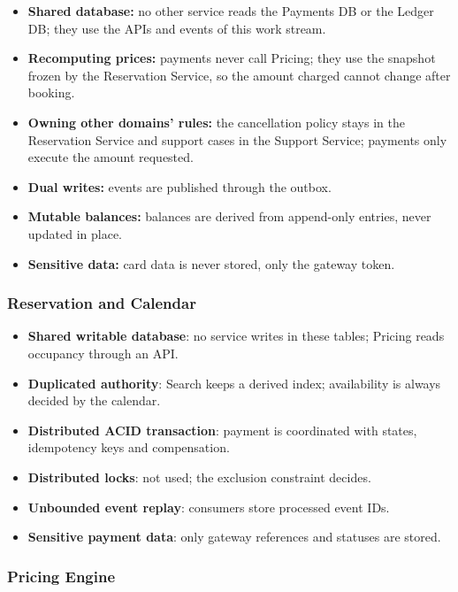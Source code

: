 \begin{itemize}
  \item \textbf{Shared database:} no other service reads the Payments DB or
    the Ledger DB; they use the APIs and events of this work stream.
  \item \textbf{Recomputing prices:} payments never call Pricing; they use the
    snapshot frozen by the Reservation Service, so the amount charged cannot
    change after booking.
  \item \textbf{Owning other domains' rules:} the cancellation policy stays in
    the Reservation Service and support cases in the Support Service; payments
    only execute the amount requested.
  \item \textbf{Dual writes:} events are published through the outbox.
  \item \textbf{Mutable balances:} balances are derived from append-only
    entries, never updated in place.
  \item \textbf{Sensitive data:} card data is never stored, only the gateway
    token.
\end{itemize}

\subsubsection{Reservation and Calendar}
\begin{itemize}
  \item \textbf{Shared writable database}: no service writes in these tables;
    Pricing reads occupancy through an API.
  \item \textbf{Duplicated authority}: Search keeps a derived index; availability
    is always decided by the calendar.
  \item \textbf{Distributed ACID transaction}: payment is coordinated with
    states, idempotency keys and compensation.
  \item \textbf{Distributed locks}: not used; the exclusion constraint decides.
  \item \textbf{Unbounded event replay}: consumers store processed event IDs.
  \item \textbf{Sensitive payment data}: only gateway references and statuses are stored.
\end{itemize}

\begingroup
\setlength{\emergencystretch}{3em}
\subsubsection{Pricing Engine}
\label{sec:price-antipatterns}

